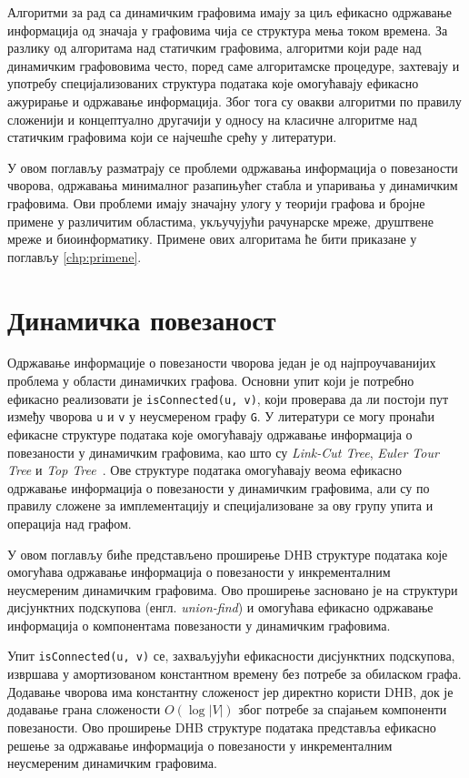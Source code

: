 
Алгоритми за рад са динамичким графовима имају за циљ ефикасно одржавање информација од значаја у графовима чија се структура мења током времена. За разлику од алгоритама над статичким графовима, алгоритми који раде над динамичким графововима често, поред саме алгоритамске процедуре, захтевају и употребу специјализованих структура података које омогућавају ефикасно ажурирање и одржавање информација. Због тога су овакви алгоритми по правилу сложенији и концептуално другачији у односу на класичне алгоритме над статичким графовима који се најчешће срећу у литератури.

У овом поглављу разматрају се проблеми одржавања информација о повезаности чворова, одржавања минималног разапињућег стабла и упаривања у динамичким графовима. Ови проблеми имају значајну улогу у теорији графова и бројне примене у различитим областима, укључујући рачунарске мреже, друштвене мреже и биоинформатику. Примене ових алгоритама ће бити приказане у поглављу \ref{chp:primene}.

\section{Динамичка повезаност}

Одржавање информације о повезаности чворова један је од најпроучаванијих проблема у области динамичких графова. Основни упит који је потребно ефикасно реализовати је \texttt{isConnected(u, v)}, који проверава да ли постоји пут између чворова \texttt{u} и \texttt{v} у неусмереном графу \texttt{G}. У литератури се могу пронаћи ефикасне структуре података које омогућавају одржавање информација о повезаности у динамичким графовима, као што су \textit{Link-Cut Tree}, \textit{Euler Tour Tree} и \textit{Top Tree}~\cite{APPLICATIONS_OF_DYNAMIC_GRAPH, holmPolylogarithmicDeterministicFullydynamic2001}. Ове структуре података омогућавају веома ефикасно одржавање информација о повезаности у динамичким графовима, али су по правилу сложене за имплементацију и специјализоване за ову групу упита и операција над графом.

У овом поглављу биће представљено проширење DHB структуре података које омогућава одржавање информација о повезаности у инкременталним неусмереним динамичким графовима. Ово проширење засновано је на структури дисјунктних подскупова (енгл. \textit{union-find}) и омогућава ефикасно одржавање информација о компонентама повезаности у динамичким графовима. 

Упит \texttt{isConnected(u, v)} се, захваљујући ефикасности дисјунктних подскупова, извршава у амортизованом константном времену без потребе за обиласком графа. Додавање чворова има константну сложеност јер директно користи DHB, док је додавање грана сложености $O(\log |V|)$ због потребе за спајањем компоненти повезаности. Ово проширење DHB структуре података представља ефикасно решење за одржавање информација о повезаности у инкременталним неусмереним динамичким графовима.

